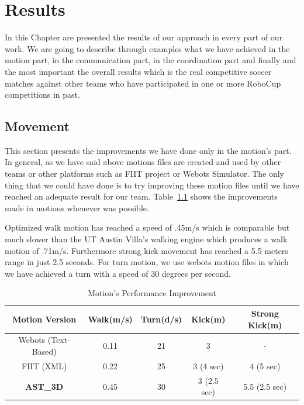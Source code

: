 \chapter{Results}
\label{results}
In this Chapter are presented the results of our approach in every part of our work. We are going to describe through examples what we have achieved in the motion part, in the communication part, in the coordination part and finally and the most important the overall results which is the real competitive soccer matches against other teams who have participated in one or more RoboCup competitions in past.

\section{Movement}
This section presents the improvements we have done only in the motion's part. In general, as we have said above motions files are created and used by other teams or other platforms such as FIIT project or Webots Simulator. The only thing that we could have done is to try improving these motion files until we have reached an adequate result for our team. Table~\ref{MotionImprovements} shows the improvements made in motions whenever was possible. 

Optimized walk motion has reached a speed of .45m/s which is comparable but much slower than the UT Austin Villa's walking engine which produces a walk motion of .71m/s. Furthermore strong kick movement has reached a 5.5 meters range in just 2.5 seconds. For turn motion, we use webots motion files in which we have achieved a turn with a speed of 30 degrees per second. 

\begin{table}
\begin{center}
\begin{tabular}{ccccc}
\textbf{Motion Version} & \textbf{Walk(m/s)}	& \textbf{Turn(d/s)}	& \textbf{Kick(m)}&\textbf{Strong Kick(m)} \\
\midrule
Webots (Text-Based) 		& 0.11 				& 21 				& 3 				& - \\
FIIT (XML)				& 0.22 				& 25 				& 3 (4 sec) 		& 4 (5 sec) \\
\textbf{AST\_3D} 		& 0.45 	& 30 		& 3 (2.5 sec)& 5.5 (2.5 sec) \\
\end{tabular}
\end{center}
\label{MotionImprovements}
\caption{Motion's Performance Improvement}
\end{table}



